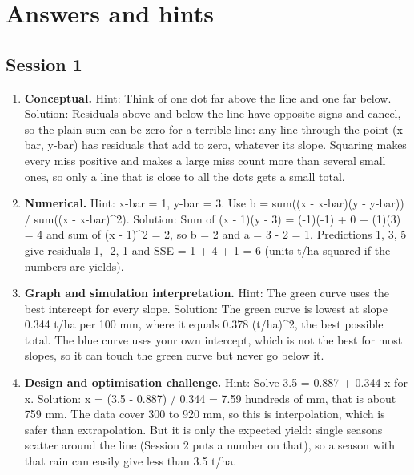 \documentclass[11pt,a4paper]{article}
\begin{document}
\section{Answers and hints}

\subsection*{Session 1}
\begin{enumerate}[nosep]
\item \textbf{Conceptual.} Hint: Think of one dot far above the line and one far below. Solution: Residuals above and below the line have opposite signs and cancel, so the plain sum can be zero for a terrible line: any line through the point (x-bar, y-bar) has residuals that add to zero, whatever its slope. Squaring makes every miss positive and makes a large miss count more than several small ones, so only a line that is close to all the dots gets a small total.
\item \textbf{Numerical.} Hint: x-bar = 1, y-bar = 3. Use b = sum((x - x-bar)(y - y-bar)) / sum((x - x-bar)\textasciicircum{}2). Solution: Sum of (x - 1)(y - 3) = (-1)(-1) + 0 + (1)(3) = 4 and sum of (x - 1)\textasciicircum{}2 = 2, so b = 2 and a = 3 - 2 = 1. Predictions 1, 3, 5 give residuals 1, -2, 1 and SSE = 1 + 4 + 1 = 6 (units t/ha squared if the numbers are yields).
\item \textbf{Graph and simulation interpretation.} Hint: The green curve uses the best intercept for every slope. Solution: The green curve is lowest at slope 0.344 t/ha per 100 mm, where it equals 0.378 (t/ha)\textasciicircum{}2, the best possible total. The blue curve uses your own intercept, which is not the best for most slopes, so it can touch the green curve but never go below it.
\item \textbf{Design and optimisation challenge.} Hint: Solve 3.5 = 0.887 + 0.344 x for x. Solution: x = (3.5 - 0.887) / 0.344 = 7.59 hundreds of mm, that is about 759 mm. The data cover 300 to 920 mm, so this is interpolation, which is safer than extrapolation. But it is only the expected yield: single seasons scatter around the line (Session 2 puts a number on that), so a season with that rain can easily give less than 3.5 t/ha.
\end{enumerate}
\end{document}
